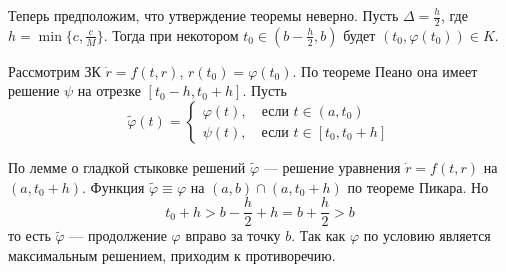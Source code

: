 Теперь предположим, что утверждение теоремы неверно. Пусть $\Delta = \frac{h}{2}$, где $h = \min \{c, \frac{c}{M}\}$. Тогда при некотором $t_0 \in (b - \frac{h}{2}, b)$ будет $(t_0, \varphi(t_0)) \in K$.

Рассмотрим ЗК $\dot{r} = f(t,r),\, r(t_0) = \varphi(t_0)$. По теореме Пеано она имеет решение $\psi$ на отрезке $[t_0 - h, t_0 + h]$. Пусть
\begin{equation*}
    \widetilde{\varphi}(t) = \begin{cases}
    \varphi(t), \quad \text{если } t \in (a, t_0)\\
    \psi(t), \quad \text{если } t \in [t_0, t_0 + h]
    \end{cases}
\end{equation*}

По лемме о гладкой стыковке решений $\widetilde{\varphi}$ --- решение уравнения $\dot{r} = f(t,r)$ на $(a, t_0 + h)$. Функция $\widetilde{\varphi} \equiv \varphi$ на $(a,b) \cap (a, t_0 + h)$ по теореме Пикара. Но
\begin{equation*}
    t_0 + h > b - \frac{h}{2} + h = b + \frac{h}{2} > b
\end{equation*}
то есть $\widetilde{\varphi}$ --- продолжение $\varphi$ вправо за точку $b$. Так как $\varphi$ по условию является максимальным решением, приходим к противоречию.
